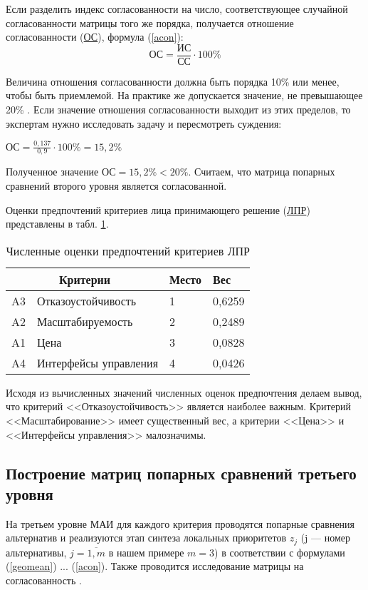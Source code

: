Если разделить индекс согласованности на число, соответствующее случайной согласованности матрицы того же порядка, получается отношение согласованности (\hyperlink{ots}{ОС}), формула (\ref{acon}):
\begin{equation}\label{acon}
\text{ОС} = \frac{\text{ИС}}{\text{СС}} \cdot 100\%
\end{equation}

Величина отношения согласованности должна быть порядка 10\% или менее, чтобы быть приемлемой.
На практике же допускается значение, не превышающее 20\% \cite{mai}.
Если значение отношения согласованности выходит из этих пределов, то экспертам нужно исследовать задачу и пересмотреть суждения:

$\text{ОС} = \frac{0,137}{0,9} \cdot 100\% = 15,2\%$

Полученное значение $\text{ОС} = 15,2\% < 20\%$.
Считаем, что матрица попарных сравнений второго уровня является согласованной.

Оценки предпочтений критериев лица принимающего решение (\hyperlink{lpr}{ЛПР}) представлены в табл. \ref{marks}.
\begin{table}[H]
  \caption{Численные оценки предпочтений критериев ЛПР}\label{marks}
  \begin{tabular}{|l|l|l|l|}
  \hline \multicolumn{2}{|c|}{Критерии} & Место & Вес \\
  \hline A3 & Отказоустойчивость & 1 & 0,6259 \\
  \hline A2 & Масштабируемость & 2 & 0,2489 \\
  \hline A1 & Цена & 3 & 0,0828 \\
  \hline A4 & Интерфейсы управления & 4 & 0,0426 \\
  \hline
  \end{tabular}
\end{table}

Исходя из вычисленных значений численных оценок предпочтения делаем вывод, что критерий <<Отказоустойчивость>> является наиболее важным.
Критерий <<Масштабирование>> имеет существенный вес, а критерии <<Цена>> и <<Интерфейсы управления>> малозначимы.

\subsection{Построение матриц попарных сравнений третьего уровня}

На третьем уровне МАИ для каждого критерия проводятся попарные сравнения альтернатив и реализуются этап синтеза локальных приоритетов $z_j$ (j --- номер альтернативы, $j = \overline{1,m}$ в нашем примере $m = 3$) в соответствии с
формулами (\ref{geomean}) ... (\ref{acon}).
Также проводится исследование матрицы на согласованность \cite{var-analyz}.

